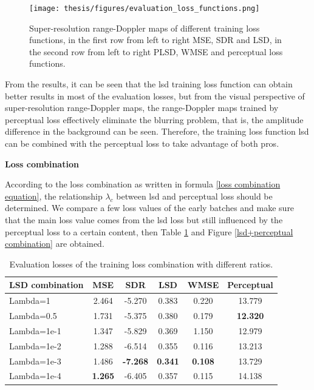 \begin{figure}
    \centering
    \texttt{[image: thesis/figures/evaluation\_loss\_functions.png]}
    \caption{Super-resolution range-Doppler maps of different training loss functions, in the first row from left to right MSE, SDR and LSD, in the second row from left to right PLSD, WMSE and perceptual loss functions.}
    \label{training loss functions comparison}
\end{figure}

From the results, it can be seen that the \gls{lsd} training loss function can obtain better results in most of the evaluation losses, but from the visual perspective of super-resolution range-Doppler maps, the range-Doppler maps trained by perceptual loss effectively eliminate the blurring problem, that is, the amplitude difference in the background can be seen. Therefore, the training loss function \gls{lsd} can be combined with the perceptual loss to take advantage of both pros.

\begin{spacing}{1.5}
\textbf{\large{Loss combination}}
\end{spacing} 
According to the loss combination as written in formula \ref{loss combination equation}, the relationship $\lambda_c$ between \gls{lsd} and perceptual loss should be determined. We compare a few loss values of the early batches and make sure that the main loss value comes from the \gls{lsd} loss but still influenced by the perceptual loss to a certain content, then Table \ref{Evaluation losses of the training loss functions combination comparison} and Figure \ref{lsd+perceptual combination} are obtained.

\begin{table}
    \centering
    \caption{Evaluation losses of the training loss combination with different ratios.}
    \label{Evaluation losses of the training loss functions combination comparison}
    \begin{tabular}{l|c|c|c|c|c}
        \hline
        LSD combination & MSE & SDR & LSD & WMSE & Perceptual \\
        \hline
        Lambda=1 & 2.464 & -5.270 & 0.383 & 0.220 & 13.779 \\
        \hline
        Lambda=0.5 & 1.731 & -5.375 & 0.380 & 0.179 & \textbf{12.320 }\\
        \hline
        Lambda=1e-1 & 1.347 & -5.829 & 0.369 & 1.150 & 12.979 \\
        \hline
        Lambda=1e-2 & 1.288 & -6.514 & 0.355 & 0.116 & 13.213 \\
        \hline
        Lambda=1e-3 & 1.486 & \textbf{-7.268} & \textbf{0.341} & \textbf{0.108} & 13.729 \\
        \hline
        Lambda=1e-4 & \textbf{1.265} & -6.405 & 0.357 & 0.115 & 14.138 \\
        \hline
    \end{tabular}
\end{table}

